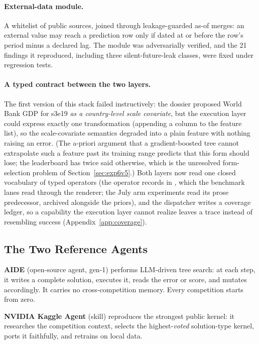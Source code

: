 \documentclass[11pt,a4paper]{article}
\begin{document}
\paragraph{External-data module.} A whitelist of public sources, joined through leakage-guarded as-of merges: an external value may reach a prediction row only if dated at or before the row's period minus a declared lag. The module was adversarially verified, and the 21 findings it reproduced, including three silent-future-leak classes, were fixed under regression tests.

\paragraph{A typed contract between the two layers.} The first version of this stack failed
instructively: the dossier proposed World Bank GDP for s3e19 \emph{as a country-level scale
covariate}, but the execution layer could express exactly one transformation (appending a
column to the feature list), so the scale-covariate semantics degraded into a plain feature with
nothing raising an error. (The a-priori argument that a gradient-boosted tree cannot extrapolate
such a feature past its training range predicts that this form should lose; the leaderboard has twice
said otherwise, which is the unresolved form-selection problem of
Section~\ref{sec:exp6v5}.) Both layers now read one closed vocabulary of typed operators
(the operator records in , which the benchmark lanes read
through the renderer; the July arm experiments read its prose predecessor, archived alongside the
priors), and the dispatcher writes a coverage ledger, so a
capability the execution layer cannot realize leaves a trace instead of resembling success
(Appendix~\ref{app:coverage}).

\subsection{The Two Reference Agents}

\textbf{AIDE} (open-source agent, gen-1) performs LLM-driven tree search: at each step, it writes a complete solution, executes it, reads the error or score, and mutates accordingly. It carries no cross-competition memory. Every competition starts from zero.

\noindent\textbf{NVIDIA Kaggle Agent} (skill) reproduces the strongest public kernel: it researches the competition context, selects the highest-\emph{voted} solution-type kernel, ports it faithfully, and retrains on local data.
\end{document}

